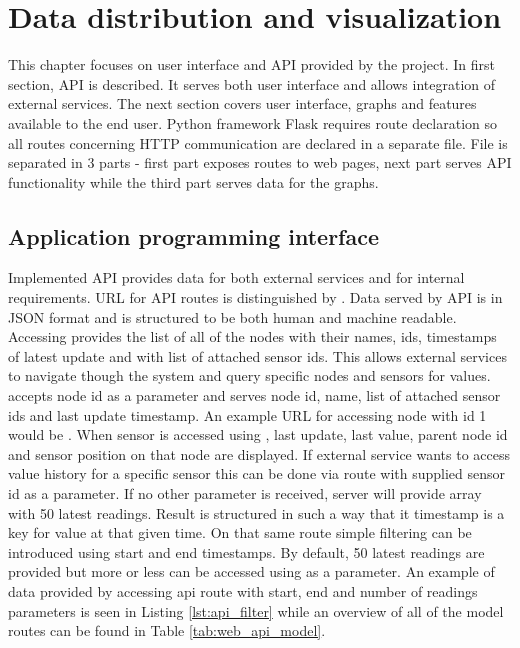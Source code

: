 \chapter{Data distribution and visualization}
\label{chap:display}

This chapter focuses on user interface and \ac{API} provided by the project. In first section, \ac{API} is described. It serves both user interface and allows integration of external services. The next section covers user interface, graphs and features available to the end user. Python framework Flask requires route declaration so all routes concerning \ac{HTTP} communication are declared in a separate file. File is separated in 3 parts - first part exposes routes to web pages, next part serves \ac{API} functionality while the third part serves data for the graphs.


\section{Application programming interface}

Implemented \ac{API} provides data for both external services and for internal requirements. \ac{URL} for \ac{API} routes is distinguished by . Data served by \ac{API} is in \ac{JSON} format and is structured to be both human and machine readable. Accessing  provides the list of all of the nodes with their names, \ac{id}s, timestamps of latest update and with list of attached sensor \ac{id}s. This allows external services to navigate though the system and query specific nodes and sensors for values.  accepts node \ac{id} as a parameter and serves node id, name, list of attached sensor ids and last update timestamp. An example \ac{URL} for accessing node with id 1 would be . When sensor is accessed using , last update, last value, parent node id and sensor position on that node are displayed. If external service wants to access value history for a specific sensor this can be done via route  with supplied sensor id as a parameter. If no other parameter is received, server will provide array with 50 latest readings. Result is structured in such a way that it timestamp is a key for value at that given time. On that same route simple filtering can be introduced using start and end timestamps. By default, 50 latest readings are provided but more or less can be accessed using  as a parameter. An example of data provided by accessing api route with start, end and number of readings parameters is seen in Listing \ref{lst:api_filter} while an overview of all of the model routes can be found in Table \ref{tab:web_api_model}.\\

